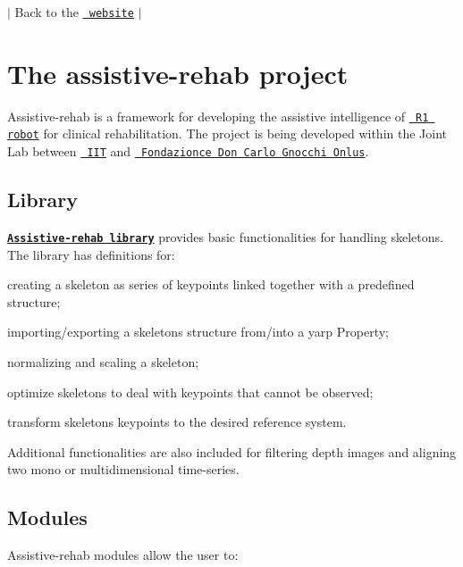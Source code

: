 $\vert$ Back to the \href{https://robotology.github.io/assistive-rehab/doc/mkdocs/site/index.html}{\texttt{ website}} $\vert$

\section*{The assistive-\/rehab project}

Assistive-\/rehab is a framework for developing the assistive intelligence of \href{https://www.youtube.com/watch?v=TBphNGW6m4o}{\texttt{ R1 robot}} for clinical rehabilitation. The project is being developed within the Joint Lab between \href{https://www.iit.it}{\texttt{ I\+IT}} and \href{https://www.dongnocchi.it}{\texttt{ Fondazionce Don Carlo Gnocchi Onlus}}.

\subsection*{Library}

\href{https://robotology.github.io/assistive-rehab/doc/doxygen/doc/html/group__skeleton.html}{\texttt{ {\bfseries{{\ttfamily Assistive-\/rehab library}}}}} provides basic functionalities for handling skeletons. The library has definitions for\+:


\begin{DoxyItemize}
\item creating a skeleton as series of keypoints linked together with a predefined structure;
\item importing/exporting a skeleton\textquotesingle{}s structure from/into a yarp Property;
\item normalizing and scaling a skeleton;
\item optimize skeletons to deal with keypoints that cannot be observed;
\item transform skeleton\textquotesingle{}s keypoints to the desired reference system.
\end{DoxyItemize}

Additional functionalities are also included for filtering depth images and aligning two mono or multidimensional time-\/series.

\subsection*{Modules}

Assistive-\/rehab modules allow the user to\+:


